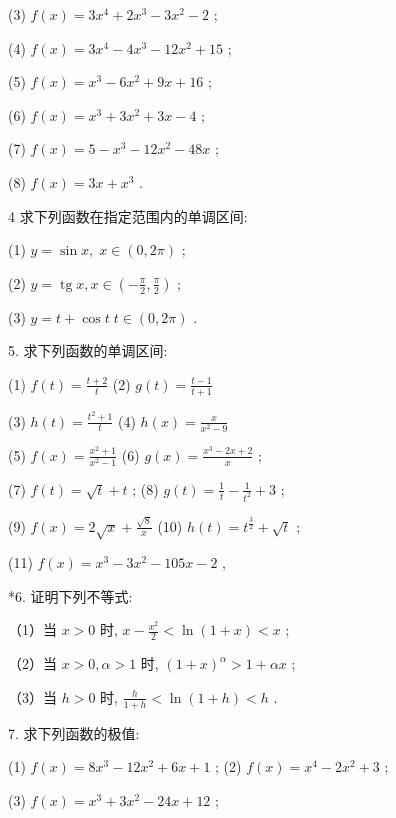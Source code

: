 \documentclass[lang=cn,newtx,10pt,scheme=chinese]{elegantbook}
\begin{document}
(3) \(f\left( x\right) = 3{x}^{4} + 2{x}^{3} - 3{x}^{2} - 2\) ;

(4) \(f\left( x\right) = 3{x}^{4} - 4{x}^{3} - {12}{x}^{2} + {15}\) ;

(5) \(f\left( x\right) = {x}^{3} - 6{x}^{2} + {9x} + {16}\) ;

(6) \(f\left( x\right) = {x}^{3} + 3{x}^{2} + {3x} - 4\) ;

(7) \(f\left( x\right) = 5 - {x}^{3} - {12}{x}^{2} - {48x}\) ;

(8) \(f\left( x\right) = {3x} + {x}^{3}\) .

4 求下列函数在指定范围内的单调区间:

(1) \(y = \sin x,\;x \in \left( {0,{2\pi }}\right)\) ;

(2) \(y = \operatorname{tg}x,x \in \left( {-\frac{\pi }{2},\frac{\pi }{2}}\right)\) ;

(3) \(y = t + \cos t\;t \in \left( {0,{2\pi }}\right)\) .

5. 求下列函数的单调区间:

(1) \(f\left( t\right) = \frac{t + 2}{t}\) (2) \(g\left( t\right) = \frac{t - 1}{t + 1}\)

(3) \(h\left( t\right) = \frac{{t}^{2} + 1}{t}\) (4) \(h\left( x\right) = \frac{x}{{x}^{2} - 9}\)

(5) \(f\left( x\right) = \frac{{x}^{2} + 1}{{x}^{2} - 1}\) (6) \(g\left( x\right) = \frac{{x}^{3} - {2x} + 2}{x}\) ;

(7) \(f\left( t\right) = \sqrt{t} + t\) ; (8) \(g\left( t\right) = \frac{1}{t} - \frac{1}{{t}^{2}} + 3\) ;

(9) \(f\left( x\right) = 2\sqrt{x} + \frac{\sqrt{8}}{x}\) (10) \(h\left( t\right) = {t}^{\frac{3}{2}} + \sqrt{t}\) ;

(11) \(f\left( x\right) = {x}^{3} - 3{x}^{2} - {105x} - 2\) ,

*6. 证明下列不等式:

（1）当 \(x > 0\) 时, \(x - \frac{{x}^{2}}{2} < \ln \left( {1 + x}\right) < x\) ;

（2）当 \(x > 0,\alpha > 1\) 时, \({\left( 1 + x\right) }^{\alpha } > 1 + {\alpha x}\) ;

（3）当 \(h > 0\) 时, \(\frac{h}{1 + h} < \ln \left( {1 + h}\right) < h\) .

7. 求下列函数的极值:

(1) \(f\left( x\right) = 8{x}^{3} - {12}{x}^{2} + {6x} + 1\) ; (2) \(f\left( x\right) = {x}^{4} - 2{x}^{2} + 3\) ;

(3) \(f\left( x\right) = {x}^{3} + 3{x}^{2} - {24x} + {12}\) ;
\end{document}
